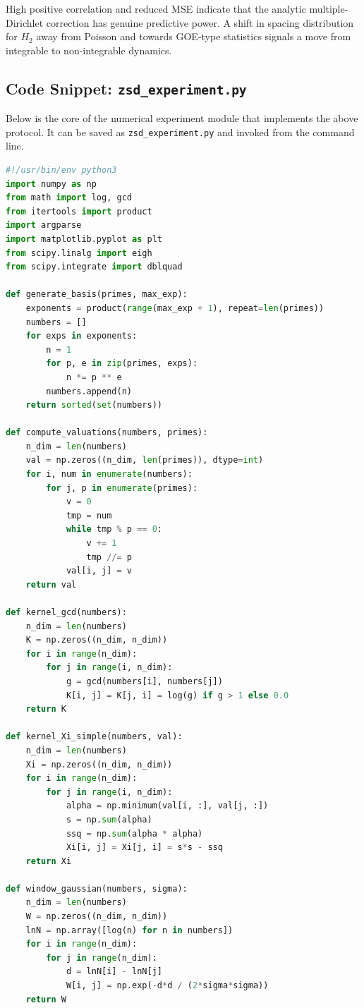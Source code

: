 \documentclass[11pt]{article}
\begin{document}
High positive correlation and reduced MSE indicate that the analytic
multiple-Dirichlet correction has genuine predictive power. A shift in
spacing distribution for $H_2$ away from Poisson and towards GOE-type
statistics signals a move from integrable to non-integrable dynamics.

\subsection{Code Snippet: \texttt{zsd\_experiment.py}}

Below is the core of the numerical experiment module that implements
the above protocol. It can be saved as \texttt{zsd\_experiment.py} and
invoked from the command line.

\begin{lstlisting}[language=Python]
#!/usr/bin/env python3
import numpy as np
from math import log, gcd
from itertools import product
import argparse
import matplotlib.pyplot as plt
from scipy.linalg import eigh
from scipy.integrate import dblquad

def generate_basis(primes, max_exp):
    exponents = product(range(max_exp + 1), repeat=len(primes))
    numbers = []
    for exps in exponents:
        n = 1
        for p, e in zip(primes, exps):
            n *= p ** e
        numbers.append(n)
    return sorted(set(numbers))

def compute_valuations(numbers, primes):
    n_dim = len(numbers)
    val = np.zeros((n_dim, len(primes)), dtype=int)
    for i, num in enumerate(numbers):
        for j, p in enumerate(primes):
            v = 0
            tmp = num
            while tmp % p == 0:
                v += 1
                tmp //= p
            val[i, j] = v
    return val

def kernel_gcd(numbers):
    n_dim = len(numbers)
    K = np.zeros((n_dim, n_dim))
    for i in range(n_dim):
        for j in range(i, n_dim):
            g = gcd(numbers[i], numbers[j])
            K[i, j] = K[j, i] = log(g) if g > 1 else 0.0
    return K

def kernel_Xi_simple(numbers, val):
    n_dim = len(numbers)
    Xi = np.zeros((n_dim, n_dim))
    for i in range(n_dim):
        for j in range(i, n_dim):
            alpha = np.minimum(val[i, :], val[j, :])
            s = np.sum(alpha)
            ssq = np.sum(alpha * alpha)
            Xi[i, j] = Xi[j, i] = s*s - ssq
    return Xi

def window_gaussian(numbers, sigma):
    n_dim = len(numbers)
    W = np.zeros((n_dim, n_dim))
    lnN = np.array([log(n) for n in numbers])
    for i in range(n_dim):
        for j in range(n_dim):
            d = lnN[i] - lnN[j]
            W[i, j] = np.exp(-d*d / (2*sigma*sigma))
    return W


\end{lstlisting}
\end{document}
